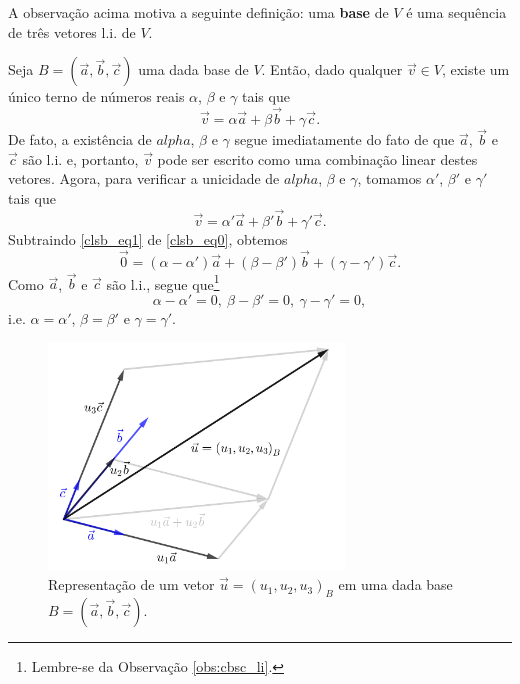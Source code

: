 A observação acima motiva a seguinte definição: uma {\bf base} de $V$ é uma sequência de três vetores l.i. de $V$.

Seja $B = (\vec{a}, \vec{b}, \vec{c})$ uma dada base de $V$. Então, dado qualquer $\vec{v}\in V$, existe um único terno de números reais $\alpha$, $\beta$ e $\gamma$ tais que
\begin{equation}
  \vec{v} = \alpha\vec{a} + \beta\vec{b} + \gamma\vec{c}.\label{clsb_eq0}
\end{equation}
De fato, a existência de $alpha$, $\beta$ e $\gamma$ segue imediatamente do fato de que $\vec{a}$, $\vec{b}$ e $\vec{c}$ são l.i. e, portanto, $\vec{v}$ pode ser escrito como uma combinação linear destes vetores. Agora, para verificar a unicidade de $alpha$, $\beta$ e $\gamma$, tomamos $\alpha'$, $\beta'$ e $\gamma'$ tais que
\begin{equation}
  \vec{v} = \alpha'\vec{a} + \beta'\vec{b} + \gamma'\vec{c}.\label{clsb_eq1}
\end{equation}
Subtraindo \eqref{clsb_eq1} de \eqref{clsb_eq0}, obtemos
\begin{equation}
  \vec{0} = (\alpha-\alpha')\vec{a}+(\beta-\beta')\vec{b}+(\gamma-\gamma')\vec{c}.
\end{equation}
Como $\vec{a}$, $\vec{b}$ e $\vec{c}$ são l.i., segue que\footnote{Lembre-se da Observação \ref{obs:cbsc_li}.}
\begin{equation}
  \alpha-\alpha'=0,~\beta-\beta'=0,~\gamma-\gamma'=0,
\end{equation}
i.e. $\alpha=\alpha'$, $\beta=\beta'$ e $\gamma=\gamma'$.

\begin{figure}[H]
  \centering
  \includegraphics[width=0.7\textwidth]{./cap_base/dados/fig_coord/fig_coord}
  \caption{Representação de um vetor $\vec{u} = (u_1, u_2, u_3)_B$ em uma dada base $B=(\vec{a},\vec{b},\vec{c})$.}
  \label{fig:coord}
\end{figure}

